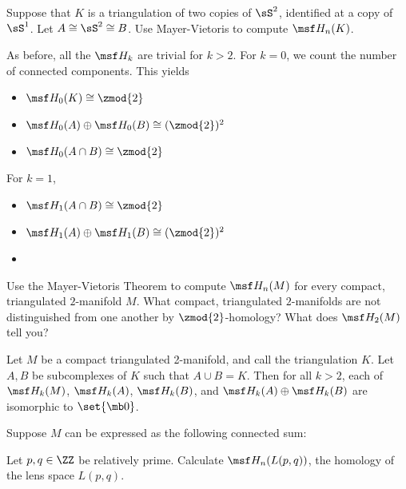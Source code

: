 \begin{problem}[FS1]
  Suppose that $K$ is a triangulation of two copies of $\sS^2$,
  identified at a copy of $\sS^1$. Let $A \cong \sS^2 \cong B$. Use
  Mayer-Vietoris to compute $\msf H_n(K)$.
\end{problem}
\begin{solution}
  As before, all the $\msf H_k$ are trivial for $k > 2$. For $k=0$, we
  count the number of connected components. This yields
  \begin{itemize}
    \item $\msf H_0(K) \cong \zmod{2}$
    \item $\msf H_0(A) \oplus \msf H_0(B) \cong (\zmod{2})^2$
    \item $\msf H_0(A \cap B) \cong \zmod{2}$
  \end{itemize}
  For $k=1$,
  \begin{itemize}
    \item $\msf H_1(A\cap B) \cong \zmod{2}$
    \item $\msf H_1(A) \oplus \msf H_1(B) \cong (\zmod{2})^2$
    \item
  \end{itemize}
\end{solution}

\begin{problem}[16.41]
  Use the Mayer-Vietoris Theorem to compute $\msf H_n(M)$ for every
  compact, triangulated $2$-manifold $M$. What compact, triangulated
  $2$-manifolds are not distinguished from one another by
  $\zmod{2}$-homology? What does $\msf H_2(M)$ tell you?
\end{problem}
\begin{solution}
  Let $M$ be a compact triangulated 2-manifold, and call the
  triangulation $K$. Let $A,B$ be subcomplexes of $K$ such that $A
  \cup B = K$. Then for all $k > 2$, each of $\msf H_k(M)$, $\msf
  H_k(A)$, $\msf H_k(B)$, and $\msf H_k(A) \oplus \msf H_k(B)$ are
  isomorphic to $\set{\mb 0}$.

  Suppose $M$ can be expressed as the following connected sum:
\end{solution}


\begin{problem}[16.42]
  Let $p,q\in\ZZ$ be relatively prime. Calculate $\msf H_n(L(p,q))$,
  the homology of the lens space $L(p,q)$.
\end{problem}



